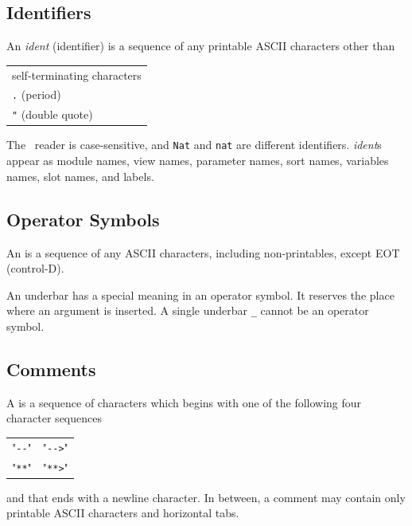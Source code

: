 \documentclass[a4paper]{memoir}
\begin{document}
\subsection{Identifiers} \label{sec:lex-identifier}

An \textit{ident} (identifier)
is a sequence of any printable ASCII characters other than
\begin{center}
\begin{minipage}{0.5\textwidth}
\begin{snugshade}
  \begin{tabular}{l}
    self-terminating characters \\
    \verb|.| (period) \\
    \verb|"| (double quote) \\
  \end{tabular}
\end{snugshade}
\end{minipage}
\end{center}

The \cafeobj~reader is case-sensitive, and \verb|Nat| and \verb|nat| are
different identifiers.
\textit{ident}s appear as module names, view names,
parameter names, sort names, variables names,
slot names, and labels.

\subsection{Operator Symbols} \label{sec:opsymbol}

An  is a sequence of any ASCII characters,
including non-printables, except EOT (control-D).

An underbar has a special meaning in an operator symbol.
It reserves the place where an argument is inserted.
A single underbar \verb|_| cannot be an operator symbol.

\subsection{Comments} \label{sec:lex-comments}

A  is a sequence of characters which begins with one
of the following four character sequences
\begin{center}
\begin{minipage}{0.5\textwidth}
\begin{snugshade}
  \begin{tabular}{ll}
    "\verb|--|" & 
    "\verb|-->|" \\
    "\verb|**|" &
    "\verb|**>|"
  \end{tabular}
\end{snugshade}
\end{minipage}
\end{center}
and that ends with a newline character. In between, a comment may
contain only printable ASCII characters and horizontal tabs.
\end{document}
